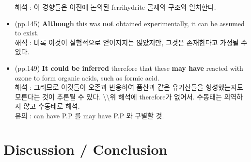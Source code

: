 \documentclass[10pt]{report}
\begin{document}
\begin{itemize}
		해석 : 이 경향들은 이전에 논의된 ferrihydrite 골재의 구조와 일치한다.
		\item (pp.145) {\bf Although} this was {\bf not} obtained experimentally, it can be assumed to exist. \\
		해석 : 비록 이것이 실험적으로 얻어지지는 않았지만, 그것은 존재한다고 가정될 수 있다.
		\item (pp.149) {\bf It could be inferred} therefore that these {\bf may have} reacted with ozone to form organic acids, such as formic acid. \\
		해석 : 그러므로 이것들이 오존과 반응하여 폼산과 같은 유기산들을 형성했는지도 모른다는 것이 추론될 수 있다. \textbackslash\textbackslash 위 해석에 therefore가 없어서. 수동태는 의역하지 않고 수동태로 해석. \\
		유의 : can have P.P 를 may have P.P 와 구별할 것.
	\end{itemize}
	
	\chapter{Discussion / Conclusion}
	
\end{document}
